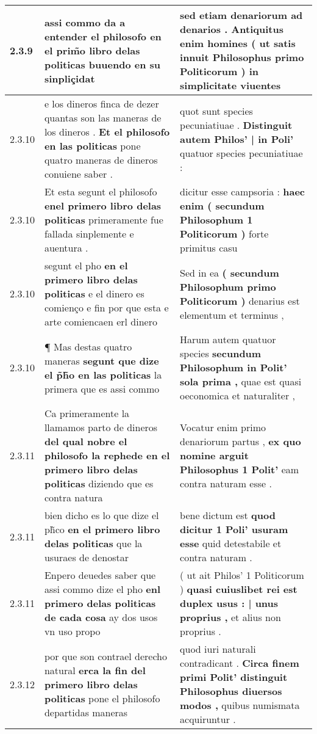 \begin{tabular}{|p{1cm}|p{6.5cm}|p{6.5cm}|}
2.3.9 & assi commo da a entender el philosofo \textbf{ en el prim̃o libro delas politicas } buuendo en su sinpliçidat & sed etiam denariorum ad denarios . Antiquitus enim homines \textbf{ ( ut satis innuit Philosophus primo Politicorum ) } in simplicitate viuentes \\\hline
2.3.10 & e los dineros finca de dezer quantas son las maneras de los dineros . \textbf{ Et el philosofo en las politicas } pone quatro maneras de dineros conuiene saber . & quot sunt species pecuniatiuae . \textbf{ Distinguit autem Philos’ | in Poli’ } quatuor species pecuniatiuae : \\\hline
2.3.10 & Et esta segunt el philosofo \textbf{ enel primero libro delas politicas } primeramente fue fallada sinplemente e auentura . & dicitur esse campsoria : \textbf{ haec enim ( secundum Philosophum 1 Politicorum ) } forte primitus casu \\\hline
2.3.10 & segunt el pho \textbf{ en el primero libro delas politicas } e el dinero es comienço e fin por que esta e arte comiencaen erl dinero & Sed in ea \textbf{ ( secundum Philosophum primo Politicorum ) } denarius est elementum et terminus , \\\hline
2.3.10 & ¶ Mas destas quatro maneras \textbf{ segunt que dize el p̃h̃o en las politicas } la primera que es assi commo & Harum autem quatuor species \textbf{ secundum Philosophum in Polit’ sola prima , } quae est quasi oeconomica et naturaliter , \\\hline
2.3.11 & Ca primeramente la llamamos parto de dineros \textbf{ del qual nobre el philosofo la rephede en el primero libro delas politicas } diziendo que es contra natura & Vocatur enim primo denariorum partus , \textbf{ ex quo nomine arguit Philosophus 1 Polit’ } eam contra naturam esse . \\\hline
2.3.11 & bien dicho es lo que dize el ph̃co \textbf{ en el primero libro delas politicas } que la usuraes de denostar & bene dictum est \textbf{ quod dicitur 1 Poli’ usuram esse } quid detestabile et contra naturam . \\\hline
2.3.11 & Enpero deuedes saber que assi commo dize el pho \textbf{ enl primero delas politicas de cada cosa } ay dos usos vn uso propo & ( ut ait Philos’ 1 Politicorum ) \textbf{ quasi cuiuslibet rei est duplex usus : | unus proprius , } et alius non proprius . \\\hline
2.3.12 & por que son contrael derecho natural \textbf{ erca la fin del primero libro delas politicas } pone el philosofo departidas maneras & quod iuri naturali contradicant . \textbf{ Circa finem primi Polit’ distinguit Philosophus diuersos modos , } quibus numismata acquiruntur . \\\hline

\end{tabular}
